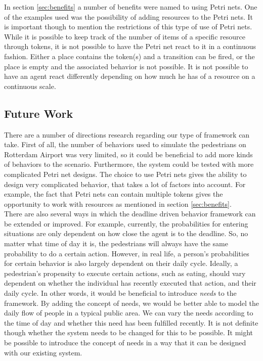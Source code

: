 \documentclass[11pt, a4paper]{book}
\begin{document}
In section \ref{sec:benefits} a number of benefits were named to using Petri nets. One of the examples used was the possibility of adding resources to the Petri nets. It is important though to mention the restrictions of this type of use of Petri nets. While it is possible to keep track of the number of items of a specific resource through tokens, it is not possible to have the Petri net react to it in a continuous fashion. Either a place contains the token(s) and a transition can be fired, or the place is empty and the associated behavior is not possible. It is not possible to have an agent react differently depending on how much he has of a resource on a continuous scale. 

\subsection{Future Work}
There are a number of directions research regarding our type of framework can take. First of all, the number of behaviors used to simulate the pedestrians on Rotterdam Airport was very limited, so it could be beneficial to add more kinds of behaviors to the scenario. Furthermore, the system could be tested with more complicated Petri net designs. The choice to use Petri nets gives the ability to design very complicated behavior, that takes a lot of factors into account. For example, the fact that Petri nets can contain multiple tokens gives the opportunity to work with resources as mentioned in section \ref{sec:benefits}.\\

There are also several ways in which the deadline driven behavior framework can be extended or improved. For example, currently, the probabilities for entering situations are only dependent on how close the agent is to the deadline. So, no matter what time of day it is, the pedestrians will always have the same probability to do a certain action. However, in real life, a person's probabilities for certain behavior is also largely dependent on their daily cycle. Ideally, a pedestrian's propensity to execute certain actions, such as eating, should vary dependent on whether the individual has recently executed that action, and their daily cycle. In other words, it would be beneficial to introduce \emph{needs} to the framework. By adding the concept of needs, we would be better able to model the daily flow of people in a typical public area. We can vary the needs according to the time of day and whether this need has been fulfilled recently. It is not definite though whether the system needs to be changed for this to be possible. It might be possible to introduce the concept of needs in a way that it can be designed with our existing system.\\
\end{document}

